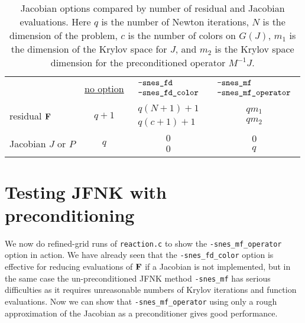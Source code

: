 \begin{table}
\begin{tabular}{lccc}
 &\underline{no option}
                       & \small\underline{$\begin{array}{ll} \text{\texttt{-snes\_fd}} \\ \text{\texttt{-snes\_fd\_color}} \end{array}$}
                                    & \small\underline{$\begin{array}{ll} \text{\texttt{-snes\_mf}} \\ \text{\texttt{-snes\_mf\_operator}} \end{array}$} \vspace{0.2in} \\
residual $\mathbf{F}$        & $q+1$ & $\begin{array}{cc} q(N+1)+1 \\ q(c+1)+1 \end{array}$ & $\begin{array}{cc} q m_1 \\ q m_2 \end{array}$ \vspace{0.1in} \\
Jacobian $J$ or $P$    & $q$ & $\begin{array}{cc} 0 \\ 0 \end{array}$ & $\begin{array}{cc} 0 \\ q \end{array}$
\end{tabular}
\caption{Jacobian options compared by number of residual and Jacobian evaluations.  Here $q$ is the number of Newton iterations, $N$ is the dimension of the problem, $c$ is the number of colors on $G(J)$, $m_1$ is the dimension of the Krylov space for $J$, and $m_2$ is the Krylov space dimension for the preconditioned operator $M^{-1}J$.} \label{tab:snesjacobianoptions:evals}
\end{table}


\section{Testing JFNK with preconditioning} \label{sec:testsnesmfoperator}

We now do refined-grid runs of \texttt{reaction.c} to show the \texttt{-snes\_mf\_operator} option in action.  We have already seen that the \texttt{-snes\_fd\_color} option is effective for reducing evaluations of $\mathbf{F}$ if a Jacobian is not implemented, but in the same case the un-preconditioned JFNK method \texttt{-snes\_mf} has serious difficulties as it requires unreasonable numbers of Krylov iterations and function evaluations.  Now we can show that \texttt{-snes\_mf\_operator} using only a rough approximation of the Jacobian as a preconditioner gives good performance.

